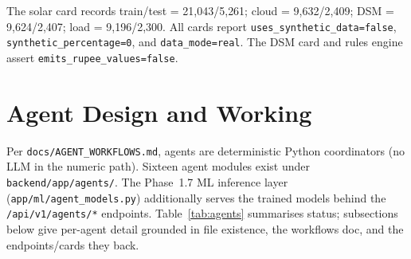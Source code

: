 \documentclass[11pt,a4paper]{article}
\newcommand{\code}[1]{\texttt{\small #1}}
\begin{document}
\noindent The solar card records train/test = 21{,}043/5{,}261; cloud = 9{,}632/2{,}409;
DSM = 9{,}624/2{,}407; load = 9{,}196/2{,}300. All cards report
\code{uses\_synthetic\_data=false}, \code{synthetic\_percentage=0}, and
\code{data\_mode=real}. The DSM card and rules engine assert
\code{emits\_rupee\_values=false}.

\section{Agent Design and Working}
Per \code{docs/AGENT\_WORKFLOWS.md}, agents are deterministic Python coordinators (no LLM
in the numeric path). Sixteen agent modules exist under \code{backend/app/agents/}. The
Phase~1.7 ML inference layer (\code{app/ml/agent\_models.py}) additionally serves the
trained models behind the \code{/api/v1/agents/*} endpoints. Table~\ref{tab:agents}
summarises status; subsections below give per-agent detail grounded in file existence,
the workflows doc, and the endpoints/cards they back.
\end{document}
